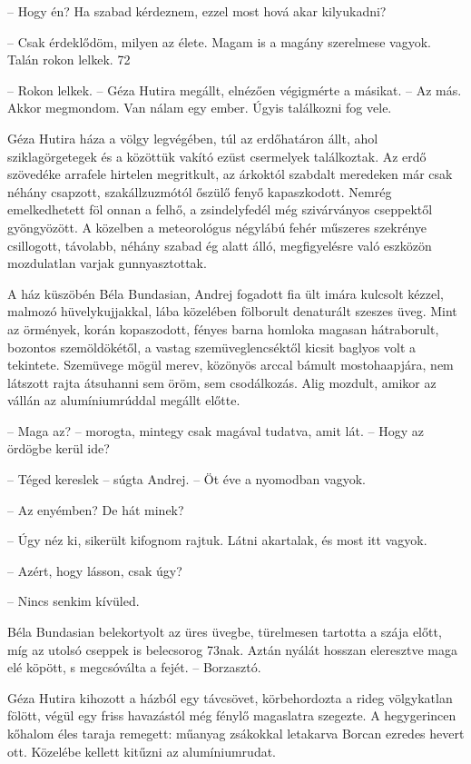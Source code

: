 \documentclass{IEEEtran}
\begin{document}
– Hogy én? Ha szabad kérdeznem, ezzel most hová akar kilyukadni?

– Csak érdeklődöm, milyen az élete. Magam is a magány szerelmese vagyok. Talán
rokon lelkek.
72

– Rokon lelkek. – Géza Hutira megállt, elnézően végigmérte a másikat. – Az
más. Akkor megmondom. Van nálam egy ember. Úgyis találkozni fog vele.

Géza Hutira háza a völgy legvégében, túl az erdőhatáron állt, ahol
sziklagörgetegek és a közöttük vakító ezüst csermelyek találkoztak. Az erdő
szövedéke arrafele hirtelen megritkult, az árkoktól szabdalt meredeken már
csak néhány csapzott, szakállzuzmótól őszülő fenyő kapaszkodott. Nemrég
emelkedhetett föl onnan a felhő, a zsindelyfedél még szivárványos cseppektől
gyöngyözött. A közelben a meteorológus négylábú fehér műszeres szekrénye
csillogott, távolabb, néhány szabad ég alatt álló, megfigyelésre való eszközön
mozdulatlan varjak gunnyasztottak.

A ház küszöbén Béla Bundasian, Andrej fogadott fia ült imára kulcsolt kézzel,
malmozó hüvelykujjakkal, lába közelében fölborult denaturált szeszes üveg.
Mint az örmények, korán kopaszodott, fényes barna homloka magasan hátraborult,
bozontos szemöldökétől, a vastag szemüveglencséktől kicsit baglyos volt a
tekintete. Szemüvege mögül merev, közönyös arccal bámult mostohaapjára, nem
látszott rajta átsuhanni sem öröm, sem csodálkozás. Alig mozdult, amikor az
vállán az alumíniumrúddal megállt előtte.

– Maga az? – morogta, mintegy csak magával tudatva, amit lát. – Hogy az
ördögbe kerül ide?

– Téged kereslek – súgta Andrej. – Öt éve a nyomodban vagyok.

– Az enyémben? De hát minek?

– Úgy néz ki, sikerült kifognom rajtuk. Látni akartalak, és most itt vagyok.

– Azért, hogy lásson, csak úgy?

– Nincs senkim kívüled.

Béla Bundasian belekortyolt az üres üvegbe, türelmesen tartotta a szája előtt,
míg az utolsó cseppek is belecsorog 73nak. Aztán nyálát hosszan eleresztve
maga elé köpött, s megcsóválta a fejét. – Borzasztó.

Géza Hutira kihozott a házból egy távcsövet, körbehordozta a rideg völgykatlan
fölött, végül egy friss havazástól még fénylő magaslatra szegezte. A
hegygerincen kőhalom éles taraja remegett: műanyag zsákokkal letakarva Borcan
ezredes hevert ott. Közelébe kellett kitűzni az alumíniumrudat.
\end{document}
